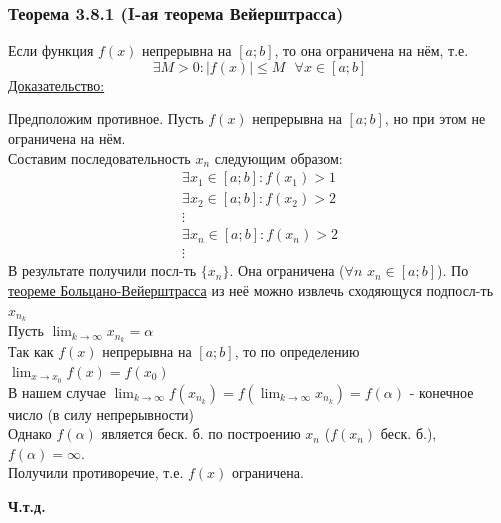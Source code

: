 \documentclass[12pt]{article}
\def\posl#1#2{\{#1_{#2}\}}
\begin{document}
    \subsubsection*{Теорема 3.8.1 (I-ая теорема Вейерштрасса)}\label{th:3.8.1}
    Если функция $f(x)$ непрерывна на $[a; b]$, то она ограничена на нём, т.е.
    \[ \exists M > 0 : \left|f(x)\right| \le M \text{ } \forall x \in [a; b] \]\noindent
    \underline{Доказательство:}
    \begin{adjustwidth}{1.5em}{1.5em}
        Предположим противное. Пусть $f(x)$ непрерывна на $[a; b]$, но при этом не ограничена на нём.\\
        Составим последовательность $x_n$ следующим образом:
            \begin{gather*}
                \exists x_1 \in [a; b] : f(x_1) > 1\\
                \exists x_2 \in [a; b] : f(x_2) > 2\\
                \vdots\\
                \exists x_n \in [a; b] : f(x_n) > 2\\
                \vdots
            \end{gather*}
        В результате получили посл-ть $\posl{x}{n}$. Она ограничена ($\forall n$ $x_n \in [a; b]$). По \hyperref[th:2.8.1]{теореме Больцано-Вейерштрасса} из неё можно извлечь сходяющуся подпосл-ть $x_{n_k}$\\
        Пусть $\lim_{k\to\infty}x_{n_k} = \alpha$\\
        Так как $f(x)$ непрерывна на $[a; b]$, то по определению $\lim_{x\to x_0} f(x) = f(x_0)$\\
        В нашем случае $\lim_{k\to\infty} f(x_{n_k}) = f(\lim_{k\to\infty}x_{n_{k}}) = f(\alpha)$ - конечное число (в силу непрерывности)\\
        Однако $f(\alpha)$ является беск. б. по построению $x_n$ ($f(x_n)$ беск. б.), $f(\alpha) = \infty$.\\
        Получили противоречие, т.е. $f(x)$ ограничена.
        \begin{center}
            \textbf{Ч.т.д.}
        \end{center} 
    \end{adjustwidth}
\end{document}

